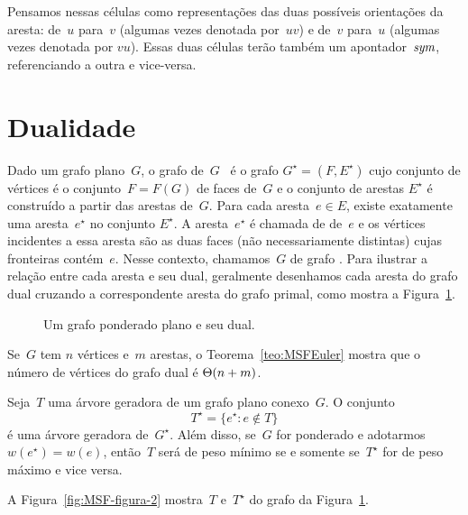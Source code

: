 Pensamos nessas células como representações das duas possíveis orientações da aresta: de~$u$ para~$v$ (algumas vezes denotada por~$uv$) e de~$v$ para~$u$ (algumas vezes denotada por $vu$).
Essas duas células terão também um apontador~$\textit{sym}$, referenciando a outra e vice-versa.

\section{Dualidade}
\label{sec:dualidade}


Dado um grafo plano~$G$, o grafo  de~$G$~\cite{Diestel} é o grafo $G^\star = (F,E^\star)$ cujo conjunto de vértices é o conjunto~$F = F(G)$ de faces de~$G$ e o conjunto de arestas $E^\star$ é construído a partir das arestas de~$G$.
Para cada aresta~$e\in E$, existe exatamente uma aresta~$e^\star$ no conjunto $E^\star$.
A aresta~$e^\star$ é chamada de  de~$e$ e os vértices incidentes a essa aresta são as duas faces (não necessariamente distintas) cujas fronteiras contém~$e$.
Nesse contexto, chamamos~$G$ de grafo .
Para ilustrar a relação entre cada aresta e seu dual, geralmente desenhamos cada aresta do grafo dual cruzando a correspondente aresta do grafo primal, como mostra a Figura~\ref{fig:MSF-basico-1}.

\begin{figure}[htb]
\scalebox{1.5}{
\centering

}
\caption{Um grafo ponderado plano e seu dual.}
\label{fig:MSF-basico-1}
\end{figure}


Se~$G$ tem $n$ vértices e~$m$ arestas, o Teorema~\ref{teo:MSFEuler} mostra que o número de vértices do grafo dual é $\Theta(n+m)$.

\begin{theorem}
\label{teo:MSFdual}
Seja~$T$ uma árvore geradora de um grafo plano conexo~$G$. O conjunto
$$
T^\star = \{e^\star:e\notin T\}
$$
é uma árvore geradora de~$G^\star$.
Além disso, se~$G$ for ponderado e adotarmos $w(e^\star) = w(e)$, então~$T$ será de peso mínimo se e somente se~$T^\star$ for de peso máximo e vice versa.
\end{theorem}

A Figura~\ref{fig:MSF-figura-2} mostra~$T$ e~$T^\star$ do grafo da Figura~\ref{fig:MSF-basico-1}.

